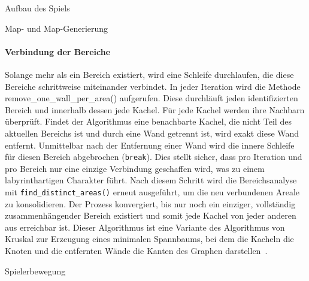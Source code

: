 \begin{section}{Aufbau des Spiels}
\begin{subsection}{Map- und Map-Generierung}
\paragraph{Verbindung der Bereiche}
Solange mehr als ein Bereich existiert, wird eine Schleife durchlaufen, die diese Bereiche schrittweise miteinander verbindet.
In jeder Iteration wird die Methode remove\_one\_wall\_per\_area() aufgerufen.
Diese durchläuft jeden identifizierten Bereich und innerhalb dessen jede Kachel.
Für jede Kachel werden ihre Nachbarn überprüft.
Findet der Algorithmus eine benachbarte Kachel, die nicht Teil des aktuellen Bereichs ist und durch eine Wand getrennt ist, wird exakt diese Wand entfernt.
Unmittelbar nach der Entfernung einer Wand wird die innere Schleife für diesen Bereich abgebrochen (\texttt{break}).
Dies stellt sicher, dass pro Iteration und pro Bereich nur eine einzige Verbindung geschaffen wird, was zu einem labyrinthartigen Charakter führt.
Nach diesem Schritt wird die Bereichsanalyse mit \texttt{find\_distinct\_areas()} erneut ausgeführt, um die neu verbundenen Areale zu konsolidieren.
Der Prozess konvergiert, bis nur noch ein einziger, vollständig zusammenhängender Bereich existiert und somit jede Kachel von jeder anderen aus erreichbar ist. Dieser Algorithmus ist eine Variante des Algorithmus von Kruskal zur Erzeugung eines minimalen Spannbaums, bei dem die Kacheln die Knoten und die entfernten Wände die Kanten des Graphen darstellen~\cite{kruskal1956shortest}.
\end{subsection}

\begin{subsection}{Spielerbewegung}


\end{subsection}
\end{section}
